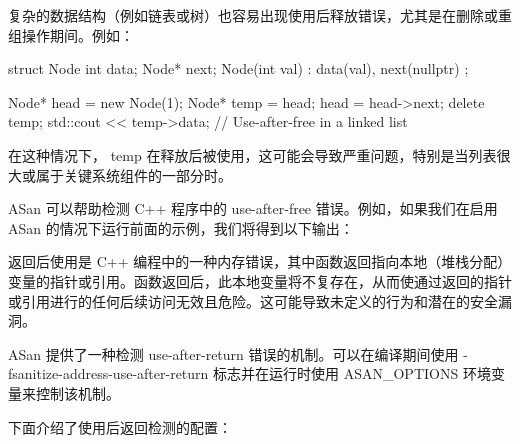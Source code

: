 复杂的数据结构（例如链表或树）也容易出现使用后释放错误，尤其是在删除或重组操作期间。例如：

\begin{cpp}
struct Node {
    int data;
    Node* next;
    Node(int val) : data(val), next(nullptr) {}
};

Node* head = new Node(1);
Node* temp = head;
head = head->next;
delete temp;
std::cout << temp->data; // Use-after-free in a linked list
\end{cpp}

在这种情况下， temp 在释放后被使用，这可能会导致严重问题，特别是当列表很大或属于关键系统组件的一部分时。

ASan 可以帮助检测 C++ 程序中的 use-after-free 错误。例如，如果我们在启用 ASan 的情况下运行前面的示例，我们将得到以下输出：



返回后使用是 C++ 编程中的一种内存错误，其中函数返回指向本地（堆栈分配）变量的指针或引用。函数返回后，此本地变量将不复存在，从而使通过返回的指针或引用进行的任何后续访问无效且危险。这可能导致未定义的行为和潜在的安全漏洞。

ASan 提供了一种检测 use-after-return 错误的机制。可以在编译期间使用 -fsanitize-address-use-after-return 标志并在运行时使用 ASAN\_OPTIONS 环境变量来控制该机制。

下面介绍了使用后返回检测的配置：

